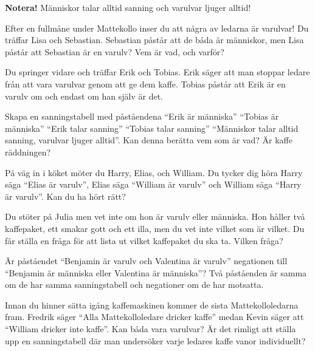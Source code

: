 \noindent
\textbf{Notera!}  Människor talar alltid sanning och varulvar ljuger alltid!

\begin{problem}
	Efter en fullmåne under Mattekollo inser du att några av ledarna är varulvar! Du träffar Lisa och Sebastian. Sebastian påstår att de båda är människor, men Lisa påstår att Sebastian är en varulv? Vem är vad, och varför?
\end{problem}

\begin{problem}
	Du springer vidare och träffar Erik och Tobias. Erik säger att man stoppar ledare från att vara varulvar genom att ge dem kaffe. Tobias påstår att Erik är en varulv om och endast om han själv är det.

	Skapa en sanningstabell med påståendena ``Erik är människa'' ``Tobias är människa'' ``Erik talar sanning'' ``Tobias talar sanning'' ``Människor talar alltid sanning, varulvar ljuger alltid''. Kan denna berätta vem som är vad? Är kaffe räddningen?
\end{problem}

\begin{problem}
	På väg in i köket möter du Harry, Elias, och William. Du tycker dig höra Harry säga ``Elias är varulv'', Elias säga ``William är varulv'' och William säga ``Harry är varulv''. Kan du ha hört rätt?
\end{problem}

\begin{problem}[Extra]
	Du stöter på Julia men vet inte om hon är varulv eller människa. Hon håller två kaffepaket, ett smakar gott och ett illa, men du vet inte vilket som är vilket. Du får ställa en fråga för att lista ut vilket kaffepaket du ska ta. Vilken fråga?
\end{problem}

\begin{problem}
	Är påståendet ``Benjamin är varulv och Valentina är varulv'' negationen till ``Benjamin är människa eller Valentina är människa''? Två påståenden är samma om de har samma sanningstabell och negationer om de har motsatta.
\end{problem}

\begin{problem}
	Innan du hinner sätta igång kaffemaskinen kommer de sista Mattekolloledarna fram. Fredrik säger ``Alla Mattekolloledare dricker kaffe'' medan Kevin säger att ``William dricker inte kaffe''. Kan båda vara varulvar? Är det rimligt att ställa upp en sanningstabell där man undersöker varje ledares kaffe vanor individuellt?
\end{problem}

